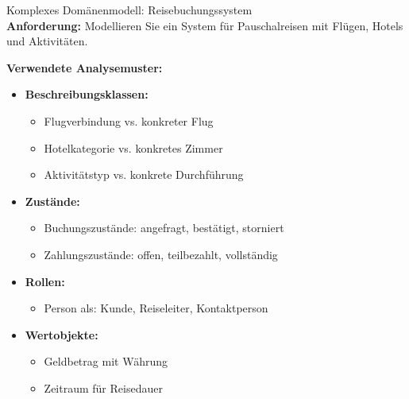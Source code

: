 \begin{example2}{Komplexes Domänenmodell: Reisebuchungssystem}\\
\textbf{Anforderung:} Modellieren Sie ein System für Pauschalreisen mit Flügen, Hotels und Aktivitäten.

\textbf{Verwendete Analysemuster:}
\begin{itemize}
    \item \textbf{Beschreibungsklassen:}
    \begin{itemize}
        \item Flugverbindung vs. konkreter Flug
        \item Hotelkategorie vs. konkretes Zimmer
        \item Aktivitätstyp vs. konkrete Durchführung
    \end{itemize}
    
    \item \textbf{Zustände:}
    \begin{itemize}
        \item Buchungszustände: angefragt, bestätigt, storniert
        \item Zahlungszustände: offen, teilbezahlt, vollständig
    \end{itemize}
    
    \item \textbf{Rollen:}
    \begin{itemize}
        \item Person als: Kunde, Reiseleiter, Kontaktperson
    \end{itemize}
    
    \item \textbf{Wertobjekte:}
    \begin{itemize}
        \item Geldbetrag mit Währung
        \item Zeitraum für Reisedauer
    \end{itemize}
\end{itemize}
\end{example2}



